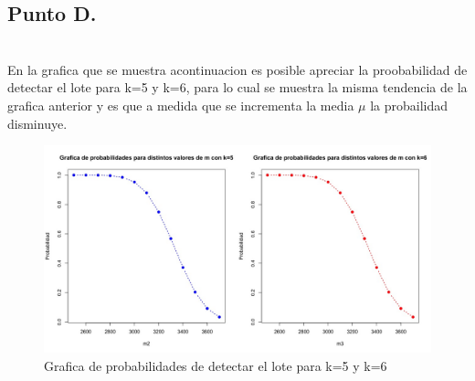 \documentclass[letterpaper,12pt,onecolumn,titlepage]{article}
\begin{document}
\pagebreak \subsection{Punto D.}
~\\ En la grafica que se muestra acontinuacion es posible apreciar la proobabilidad de detectar el lote para k=5 y k=6, para lo cual se muestra la misma tendencia de la grafica anterior y es que a medida que se incrementa la media $\mu$ la probailidad disminuye.
\begin{figure}[!h]
    \begin{center}
        \includegraphics[width=15cm]{Figuras/5d.jpeg}
        \caption{Grafica de probabilidades de detectar el lote para k=5 y k=6}
        \label{fig:Densidad}
    \end{center}
\end{figure}
\end{document}
